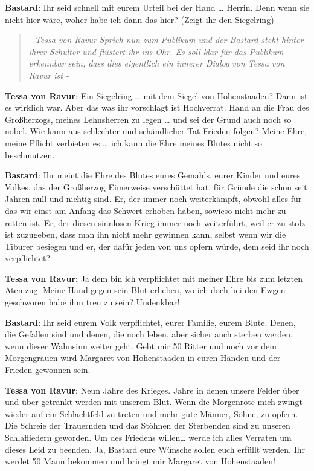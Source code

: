 \documentclass[a5paper,6pt]{book}
\begin{document}
\textbf{Bastard}: Ihr seid schnell mit eurem Urteil bei der Hand … Herrin. Denn wenn sie nicht hier wäre, woher habe ich dann das hier? (Zeigt ihr den Siegelring)

\begin{quote}
  \textit{- Tessa von Ravur Sprich nun zum Publikum und der Bastard steht hinter ihrer Schulter und flüstert ihr ins Ohr. Es soll klar für das Publikum erkennbar sein, dass dies eigentlich ein innerer Dialog von Tessa von Ravur ist -
}
 \end{quote}

\textbf{Tessa von Ravur}: Ein Siegelring … mit dem Siegel von Hohenstaaden? Dann ist es wirklich war. Aber das was ihr vorschlagt ist Hochverrat. Hand an die Frau des Großherzogs, meines Lehnsherren zu legen … und sei der Grund auch noch so nobel. Wie kann aus schlechter und schändlicher Tat Frieden folgen? Meine Ehre, meine Pflicht verbieten es … ich kann die Ehre meines Blutes nicht so beschmutzen.

\textbf{Bastard}: Ihr meint die Ehre des Blutes eures Gemahls, eurer Kinder und eures Volkes, das der Großherzog Eimerweise verschüttet hat, für Gründe die schon seit Jahren null und nichtig sind. Er, der immer noch weiterkämpft, obwohl alles für das wir einst am Anfang das Schwert erhoben haben, sowieso nicht mehr zu retten ist. Er, der diesen sinnlosen Krieg immer noch weiterführt, weil er zu stolz ist zuzugeben, dass man ihn nicht mehr gewinnen kann, selbst wenn wir die Tiburer besiegen und er, der dafür jeden von uns opfern würde, dem seid ihr noch verpflichtet?

\textbf{Tessa von Ravur}: Ja dem bin ich verpflichtet mit meiner Ehre bis zum letzten Atemzug. Meine Hand gegen sein Blut erheben, wo ich doch bei den Ewgen geschworen habe ihm treu zu sein? Undenkbar!

\textbf{Bastard}: Ihr seid eurem Volk verpflichtet, eurer Familie, eurem Blute. Denen, die Gefallen sind und denen, die noch leben, aber sicher auch sterben werden, wenn dieser Wahnsinn weiter geht. Gebt mir 50 Ritter und noch vor dem Morgengrauen wird Margaret von Hohenstaaden in euren Händen und der Frieden gewonnen sein.

\textbf{Tessa von Ravur}: Neun Jahre des Krieges. Jahre in denen unsere Felder über und über getränkt werden mit unserem Blut. Wenn die Morgenröte mich zwingt wieder auf ein Schlachtfeld zu treten und mehr gute Männer, Söhne, zu opfern. Die Schreie der Trauernden und das Stöhnen der Sterbenden sind zu unseren Schlafliedern geworden. Um des Friedens willen… werde ich alles Verraten um dieses Leid zu beenden. Ja, Bastard eure Wünsche sollen euch erfüllt werden. Ihr werdet 50 Mann bekommen und bringt mir Margaret von Hohenstaaden!
\end{document}
